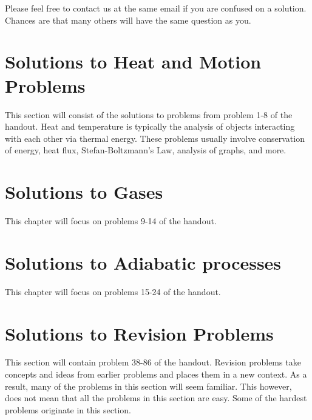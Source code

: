 \documentclass[11pt]{article}
\begin{document}
Please feel free to contact us at the same email if you are confused on a solution. Chances are that many others will have the same question as you.

\newpage
\section{Solutions to Heat and Motion Problems}
\vspace{-5mm}
This section will consist of the solutions to problems from problem 1-8 of the handout. Heat and temperature is typically the analysis of objects interacting with each other via thermal energy. These problems usually involve conservation of energy, heat flux, Stefan-Boltzmann's Law, analysis of graphs, and more. 










\newpage
\section{Solutions to Gases}

This chapter will focus on problems 9-14 of the handout.








\newpage
\section{Solutions to Adiabatic processes}

This chapter will focus on problems 15-24 of the handout.


























\newpage
\section{Solutions to Revision Problems}
This section will contain problem 38-86 of the handout. Revision problems take concepts and ideas from earlier problems and places them in a new context. As a result, many of the problems in this section will seem familiar. This however, does not mean that all the problems in this section are easy. Some of the hardest problems originate in this section.



\newpage















































\end{document}
